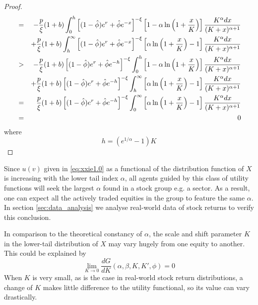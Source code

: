 \documentclass{article}
\newcommand{\td}[2]{
  \frac{d #1}{d #2}
}
\newcommand{\1}[1]{
  \mathbf{1}_{\{#1\}}
}
\begin{document}
\begin{proof}
\begin{eqnarray*}
      &=&
      - {p \over \xi}
      (1 + b)
      \int_{0}^{h}
      \left[
        (1 - \hat\phi) e^r + \hat\phi e^{-x}
      \right]^{-\xi}
      \left[
        1 - \alpha \ln \left(
          1 + {x \over K}
        \right)
      \right]
      {K^{\alpha} dx
        \over
        (K + x)^{\alpha + 1}
      } \\
      &&
      + {p \over \xi}
      (1 + b)
      \int_{h}^{\infty}
      \left[
        (1 - \hat\phi) e^r + \hat\phi e^{-x}
      \right]^{-\xi}
      \left[
        \alpha \ln \left(
          1 + {x \over K}
        \right) - 1
      \right]
      {K^{\alpha} dx
        \over
        (K + x)^{\alpha + 1}
      } \\
      &>&
      - {p \over \xi}
      (1 + b)
      \left[
        (1 - \hat\phi) e^r + \hat\phi e^{-h}
      \right]^{-\xi}
      \int_{0}^{h}
      \left[
        1 - \alpha \ln \left(
          1 + {x \over K}
        \right)
      \right]
      {K^{\alpha} dx
        \over
        (K + x)^{\alpha + 1}
      } \\
      &&
      + {p \over \xi}
      (1 + b)
      \left[
        (1 - \hat\phi) e^r + \hat\phi e^{-h}
      \right]^{-\xi}
      \int_{h}^{\infty}
      \left[
        \alpha \ln \left(
          1 + {x \over K}
        \right) - 1
      \right]
      {K^{\alpha} dx
        \over
        (K + x)^{\alpha + 1}
      } \\
      &=&
      {p \over \xi}
      (1 + b)
      \left[
        (1 - \hat\phi) e^r + \hat\phi e^{-h}
      \right]^{-\xi}
      \int_{0}^{\infty}
      \left[
        \alpha \ln \left(
          1 + {x \over K}
        \right) - 1
      \right]
      {K^{\alpha} dx
        \over
        (K + x)^{\alpha + 1}
      } \\
      &=& 0
    \end{eqnarray*}
    where
    \[
    h = (e^{1/\alpha} - 1)K
    \]
  \end{proof}
Since $u(v)$ given in \eqref{eq:xxie1.0} as a
functional of the distribution function of $X$ is increasing with the
lower tail index $\alpha$, all agents guided by this class of utility
functions will seek the largest $\alpha$ found in a stock group e.g.
a sector. As a result, one can expect all the actively traded equities
in the group to feature the same $\alpha$. In section
\ref{sec:data_analysis} we analyse real-world data of stock returns to
verify this conclusion.

In comparison to the theoretical constancy of $\alpha$, the scale and
shift parameter $K$ in the lower-tail distribution of $X$ may vary
hugely from one equity to another. This could be explained by
\[
\lim_{K \to 0} \td{G}{K}(\alpha, \beta, K, K', \phi) = 0
\]
When $K$ is very small, as is the case in real-world stock return
distributions, a change of $K$ makes little difference to the utility
functional, so its value can vary drastically.
\end{document}
